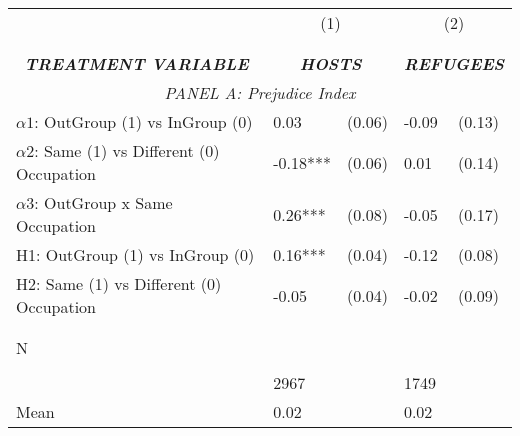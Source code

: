 \begin{tabular}{l*{4}{l}} \toprule 
                &\multicolumn{2}{c}{(1)}&\multicolumn{2}{c}{(2)}\\
                &\multicolumn{2}{c}{ } &\multicolumn{2}{c}{ } \\
\\[-0.6cm] \multicolumn{1}{c}{\textit{\textbf{TREATMENT VARIABLE}}} & \multicolumn{2}{c}{\textit{\textbf{HOSTS}}} & \multicolumn{2}{c}{\textit{\textbf{REFUGEES}}} \\  \multicolumn{5}{c}{\textit{PANEL A: Prejudice Index}} \\  \midrule  
$\alpha1$: OutGroup (1) vs InGroup (0)&     0.03   &   (0.06)&    -0.09   &   (0.13)\\
$\alpha2$: Same (1) vs Different (0) Occupation&    -0.18***&   (0.06)&     0.01   &   (0.14)\\
$\alpha3$: OutGroup x Same Occupation&     0.26***&   (0.08)&    -0.05   &   (0.17)\\
 
H1: OutGroup (1) vs InGroup (0)&     0.16***&   (0.04)&    -0.12   &   (0.08)\\
 
H2: Same (1) vs Different (0) Occupation&    -0.05   &   (0.04)&    -0.02   &   (0.09)\\
 
\\\\[-0.5cm] N \\\\[-0.6cm]&     2967   &         &     1749   &         \\
Mean            &     0.02&         &     0.02&         \\
 
\bottomrule  \end{tabular}  
